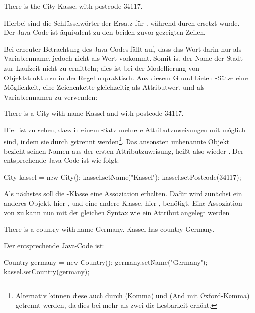 \begin{codeblock}
    There is the City Kassel with postcode 34117.
\end{codeblock}

Hierbei sind die Schlüsselwörter  der Ersatz für , während  durch  ersetzt wurde.
Der Java-Code ist äquivalent zu den beiden zuvor gezeigten Zeilen.

Bei erneuter Betrachtung des Java-Codes fällt auf, dass das Wort  darin nur als Variablenname, jedoch nicht als Wert vorkommt.
Somit ist der Name der Stadt zur Laufzeit nicht zu ermitteln;
dies ist bei der Modellierung von Objektstrukturen in der Regel unpraktisch.
Aus diesem Grund bieten -Sätze eine Möglichkeit, eine Zeichenkette gleichzeitig als Attributwert und als Variablennamen zu verwenden:

\begin{codeblock}
    There is a City with name Kassel and with postcode 34117.
\end{codeblock}

Hier ist zu sehen, dass in einem -Satz mehrere Attributzuweisungen mit  möglich sind, indem sie durch  getrennt werden\footnote{
Alternativ können diese auch durch \code{,} (Komma) und  (And mit Oxford-Komma) getrennt werden, da dies bei mehr als zwei  die Lesbarkeit erhöht.
}.
Das ansonsten unbenannte Objekt bezieht seinen Namen aus der ersten Attributzuweisung, heißt also wieder .
Der entsprechende Java-Code ist wie folgt:

\begin{jcodeblock}
    City kassel = new City();
    kassel.setName("Kassel");
    kassel.setPostcode(34117);
\end{jcodeblock}

Als nächstes soll die -Klasse eine Assoziation erhalten.
Dafür wird zunächst ein anderes Objekt, hier , und eine andere Klasse, hier , benötigt.
Eine Assoziation von  zu  kann nun mit der gleichen Syntax wie ein Attribut angelegt werden.

\begin{codeblock}
    There is a country with name Germany.
    Kassel has country Germany.
\end{codeblock}

Der entsprechende Java-Code ist:

\begin{jcodeblock}
    Country germany = new Country();
    germany.setName("Germany");
    kassel.setCountry(germany);
\end{jcodeblock}

